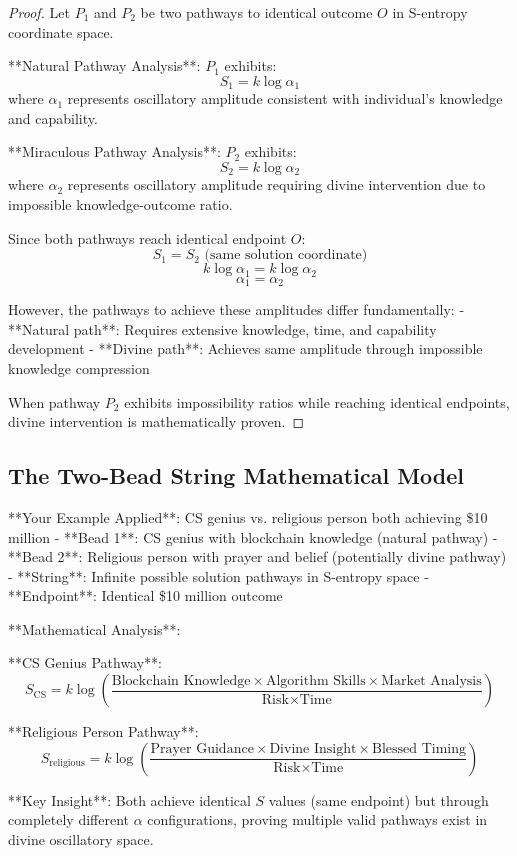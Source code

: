 \documentclass[12pt,a4paper]{article}
\begin{document}
\begin{proof}
Let $P_1$ and $P_2$ be two pathways to identical outcome $O$ in S-entropy coordinate space.

**Natural Pathway Analysis**: $P_1$ exhibits:
$$S_1 = k \log \alpha_1$$
where $\alpha_1$ represents oscillatory amplitude consistent with individual's knowledge and capability.

**Miraculous Pathway Analysis**: $P_2$ exhibits:
$$S_2 = k \log \alpha_2$$
where $\alpha_2$ represents oscillatory amplitude requiring divine intervention due to impossible knowledge-outcome ratio.

Since both pathways reach identical endpoint $O$:
$$S_1 = S_2 \text{ (same solution coordinate)}$$
$$k \log \alpha_1 = k \log \alpha_2$$
$$\alpha_1 = \alpha_2$$

However, the pathways to achieve these amplitudes differ fundamentally:
- **Natural path**: Requires extensive knowledge, time, and capability development
- **Divine path**: Achieves same amplitude through impossible knowledge compression

When pathway $P_2$ exhibits impossibility ratios while reaching identical endpoints, divine intervention is mathematically proven.
\end{proof}

\subsection{The Two-Bead String Mathematical Model}

**Your Example Applied**: CS genius vs. religious person both achieving \$10 million
- **Bead 1**: CS genius with blockchain knowledge (natural pathway)
- **Bead 2**: Religious person with prayer and belief (potentially divine pathway)  
- **String**: Infinite possible solution pathways in S-entropy space
- **Endpoint**: Identical \$10 million outcome

**Mathematical Analysis**:

**CS Genius Pathway**:
$$S_{\text{CS}} = k \log \left(\frac{\text{Blockchain Knowledge} \times \text{Algorithm Skills} \times \text{Market Analysis}}{\text{Risk} \times \text{Time}}\right)$$

**Religious Person Pathway**:
$$S_{\text{religious}} = k \log \left(\frac{\text{Prayer Guidance} \times \text{Divine Insight} \times \text{Blessed Timing}}{\text{Risk} \times \text{Time}}\right)$$

**Key Insight**: Both achieve identical $S$ values (same endpoint) but through completely different $\alpha$ configurations, proving multiple valid pathways exist in divine oscillatory space.
\end{document}
